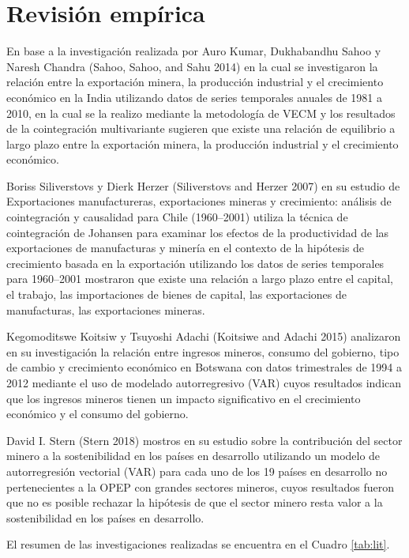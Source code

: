 \documentclass[11pt,]{article}
\begin{document}
\hypertarget{revision-empirica}{%
\section{Revisión empírica}\label{revision-empirica}}

En base a la investigación realizada por Auro Kumar, Dukhabandhu Sahoo y
Naresh Chandra (Sahoo, Sahoo, and Sahu 2014) en la cual se investigaron
la relación entre la exportación minera, la producción industrial y el
crecimiento económico en la India utilizando datos de series temporales
anuales de 1981 a 2010, en la cual se la realizo mediante la metodología
de VECM y los resultados de la cointegración multivariante sugieren que
existe una relación de equilibrio a largo plazo entre la exportación
minera, la producción industrial y el crecimiento económico.

Boriss Siliverstovs y Dierk Herzer (Siliverstovs and Herzer 2007) en su
estudio de Exportaciones manufactureras, exportaciones mineras y
crecimiento: análisis de cointegración y causalidad para Chile
(1960--2001) utiliza la técnica de cointegración de Johansen para
examinar los efectos de la productividad de las exportaciones de
manufacturas y minería en el contexto de la hipótesis de crecimiento
basada en la exportación utilizando los datos de series temporales para
1960--2001 mostraron que existe una relación a largo plazo entre el
capital, el trabajo, las importaciones de bienes de capital, las
exportaciones de manufacturas, las exportaciones mineras.

Kegomoditswe Koitsiw y Tsuyoshi Adachi (Koitsiwe and Adachi 2015)
analizaron en su investigación la relación entre ingresos mineros,
consumo del gobierno, tipo de cambio y crecimiento económico en Botswana
con datos trimestrales de 1994 a 2012 mediante el uso de modelado
autorregresivo (VAR) cuyos resultados indican que los ingresos mineros
tienen un impacto significativo en el crecimiento económico y el consumo
del gobierno.

David I. Stern (Stern 2018) mostros en su estudio sobre la contribución
del sector minero a la sostenibilidad en los países en desarrollo
utilizando un modelo de autorregresión vectorial (VAR) para cada uno de
los 19 países en desarrollo no pertenecientes a la OPEP con grandes
sectores mineros, cuyos resultados fueron que no es posible rechazar la
hipótesis de que el sector minero resta valor a la sostenibilidad en los
países en desarrollo.

El resumen de las investigaciones realizadas se encuentra en el Cuadro
\ref{tab:lit}.
\end{document}
